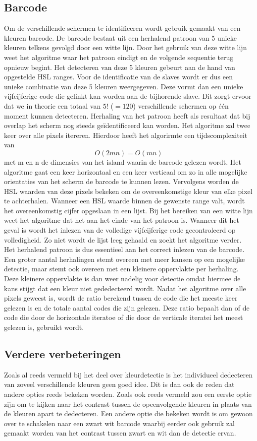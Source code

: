  \subsection{Barcode} \label{barcode}
Om de verschillende schermen te identificeren wordt gebruik gemaakt van een kleuren barcode. De barcode bestaat uit een herhalend patroon van 5 unieke kleuren telkens gevolgd door een witte lijn. Door het gebruik van deze witte lijn weet het algoritme waar het patroon eindigt en de volgende sequentie terug opnieuw begint. Het detecteren van deze 5 kleuren gebeurt aan de hand van opgestelde HSL ranges. Voor de identificatie van de slaves wordt er dus een unieke combinatie van deze 5 kleuren weergegeven. Deze vormt dan een unieke vijfcijferige code die gelinkt kan worden aan de bijhorende slave. Dit zorgt ervoor dat we in theorie een totaal van $5!$ ($=120$) verschillende schermen op één moment kunnen detecteren. Herhaling van het patroon heeft als resultaat dat bij overlap het scherm nog steeds geïdentificeerd kan worden. Het algoritme zal twee keer over alle pixels itereren. Hierdoor heeft het algorirmte een tijdscomplexiteit van
\[O(2mn)=O(mn)\]
met m en n de dimensies van het island waarin de barcode gelezen wordt. Het algoritme gaat een keer horizontaal en een keer verticaal om zo in alle mogelijke orientaties van het scherm de barcode te kunnen lezen. Vervolgens worden de HSL waarden van deze pixels bekeken om de overeenkomstige kleur van elke pixel te achterhalen. Wanneer een HSL waarde binnen de gewenste range valt, wordt het overeenkomstig cijfer opgeslaan in een lijst. Bij het bereiken van een witte lijn weet het algoritme dat het aan het einde van het patroon is. Wanneer dit het geval is wordt het inlezen van de volledige vijfcijferige code gecontroleerd op volledigheid. Zo niet wordt de lijst leeg gehaald en zoekt het algoritme verder. Het herhalend patroon is dus essentieel aan het correct inlezen van de barcode. Een groter aantal herhalingen stemt overeen met meer kansen op een mogelijke detectie, maar stemt ook overeen met een kleinere oppervlakte per herhaling. Deze kleinere oppervlakte is dan weer nadelig voor detectie omdat hiermee de kans stijgt dat een kleur niet gededecteerd wordt. Nadat het algoritme over alle pixels geweest is, wordt de ratio berekend tussen de code die het meeste keer gelezen is en de totale aantal codes die zijn gelezen. Deze ratio bepaalt dan of de code die door de horizontale iteratoe of die door de verticale iteratei het meest gelezen is, gebruikt wordt.

\subsection{Verdere verbeteringen}
Zoals al reeds vermeld bij het deel over kleurdetectie is het individueel dedecteren van zoveel verschillende kleuren geen goed idee. Dit is dan ook de reden dat andere opties reeds bekeken worden. Zoals ook reeds vermeld zou een eerste optie zijn om te kijken naar het contrast tussen de opeenvolgende kleuren in plaats van de kleuren apart te dedecteren. Een andere optie die bekeken wordt is om gewoon over te schakelen naar een zwart wit barcode waarbij eerder ook gebruik zal gemaakt worden van het contrast tussen zwart en wit dan de detectie ervan.
